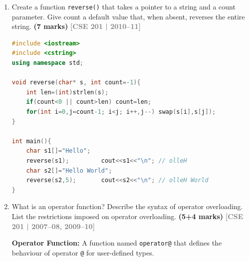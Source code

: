 \documentclass[12pt,a3paper]{article}
\newcommand{\yr}[1]{\hfill\textcolor{gray}{\small\textbf{[#1]}}}
\newcommand{\mk}[1]{\textcolor{orange!70!black}{\small\textbf{(#1 marks)}}}
\begin{document}
\begin{enumerate}
\begin{tcolorbox}[enhanced,breakable,ansbox,colback=cF!4,colframe=cF,
  boxrule=0.8pt,arc=5pt,
  title={\textbf{Answer --- Overload < and > for coord}},
  fonttitle=\bfseries\color{white},colbacktitle=cF]
\begin{lstlisting}[language=C++]
bool operator<(const coord& ob) const {
    return (x < ob.x) && (y < ob.y);
}
bool operator>(const coord& ob) const {
    return (x > ob.x) && (y > ob.y);
}
// coord c1(1,2), c2(3,4);
// c1<c2 -> true; c2>c1 -> true
\end{lstlisting}

\end{tcolorbox}

\item Create a function \texttt{reverse()} that takes a pointer to a string and a count parameter. Give count a default value that, when absent, reverses the entire string. \mk{7}
\yr{CSE 201 | 2010--11}

\begin{tcolorbox}[enhanced,breakable,ansbox,colback=cF!4,colframe=cF,
  boxrule=0.8pt,arc=5pt,
  title={\textbf{Answer --- reverse() with default count parameter}},
  fonttitle=\bfseries\color{white},colbacktitle=cF]

\begin{lstlisting}[language=C++]
#include <iostream>
#include <cstring>
using namespace std;

void reverse(char* s, int count=-1){
    int len=(int)strlen(s);
    if(count<0 || count>len) count=len;
    for(int i=0,j=count-1; i<j; i++,j--) swap(s[i],s[j]);
}

int main(){
    char s1[]="Hello";
    reverse(s1);         cout<<s1<<"\n"; // olleH
    char s2[]="Hello World";
    reverse(s2,5);       cout<<s2<<"\n"; // olleH World
}
\end{lstlisting}

\end{tcolorbox}

\item What is an operator function? Describe the syntax of operator overloading. List the restrictions imposed on operator overloading. \mk{5+4}
\yr{CSE 201 | 2007--08, 2009--10}


\begin{tcolorbox}[enhanced,breakable,ansbox,colback=cF!4,colframe=cF,
  boxrule=0.8pt,arc=5pt,
  title={\textbf{Answer --- Operator function, syntax, restrictions}},
  fonttitle=\bfseries\color{white},colbacktitle=cF]

\textbf{Operator Function:} A function named \texttt{operator@} that
defines the behaviour of operator \texttt{@} for user-defined types.


\end{tcolorbox}
\end{enumerate}
\end{document}
